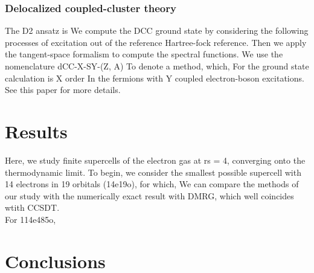 \documentclass[%
 reprint,
 amsmath,amssymb,
 aps,
]{revtex4-2}
\begin{document}
\subsubsection{Delocalized coupled-cluster theory}
The D2 ansatz is 
We compute the DCC ground state by considering the following processes of excitation out of the reference Hartree-fock reference. Then we apply the tangent-space formalism to compute the spectral functions. We use the nomenclature dCC-X-SY-(Z, A) To denote a method, which, For the ground state calculation is X order In the fermions with Y coupled electron-boson excitations. See this paper for more details. 
\section{Results}
Here, we study finite supercells of the electron gas at rs = 4, converging onto the thermodynamic limit. To begin, we consider the smallest possible supercell with 14 electrons in 19 orbitals (14e19o), for which, We can compare the methods of our study with  the numerically exact result with DMRG, which well coincides wtith CCSDT.\\
For 114e485o, 
\section{Conclusions}


\end{document}
